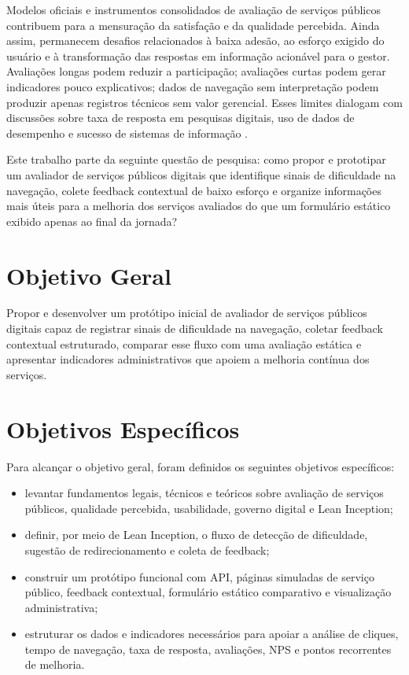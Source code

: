 Modelos oficiais e instrumentos consolidados de avaliação de serviços públicos
contribuem para a mensuração da satisfação e da qualidade percebida. Ainda assim,
permanecem desafios relacionados à baixa adesão, ao esforço exigido do usuário e
à transformação das respostas em informação acionável para o gestor. Avaliações
longas podem reduzir a participação; avaliações curtas podem gerar indicadores
pouco explicativos; dados de navegação sem interpretação podem produzir apenas
registros técnicos sem valor gerencial. Esses limites dialogam com discussões
sobre taxa de resposta em pesquisas digitais, uso de dados de desempenho e
sucesso de sistemas de informação
\cite{delightedResponseRate,surveymonkeyResponseRate,govuk2021usingData,deloneMclean2003}.

Este trabalho parte da seguinte questão de pesquisa: como propor e prototipar um
avaliador de serviços públicos digitais que identifique sinais de dificuldade na
navegação, colete feedback contextual de baixo esforço e organize informações
mais úteis para a melhoria dos serviços avaliados do que um formulário estático
exibido apenas ao final da jornada?

\section{Objetivo Geral}

Propor e desenvolver um protótipo inicial de avaliador de serviços públicos
digitais capaz de registrar sinais de dificuldade na navegação, coletar feedback
contextual estruturado, comparar esse fluxo com uma avaliação estática e
apresentar indicadores administrativos que apoiem a melhoria contínua dos
serviços.

\section{Objetivos Específicos}

Para alcançar o objetivo geral, foram definidos os seguintes objetivos
específicos:

\begin{itemize}
    \item levantar fundamentos legais, técnicos e teóricos sobre avaliação de
    serviços públicos, qualidade percebida, usabilidade, governo digital e Lean
    Inception;
    \item definir, por meio de Lean Inception, o fluxo de detecção de
    dificuldade, sugestão de redirecionamento e coleta de feedback;
    \item construir um protótipo funcional com API, páginas simuladas de serviço
    público, feedback contextual, formulário estático comparativo e visualização
    administrativa;
    \item estruturar os dados e indicadores necessários para apoiar a análise de
    cliques, tempo de navegação, taxa de resposta, avaliações, NPS e pontos
    recorrentes de melhoria.
\end{itemize}


